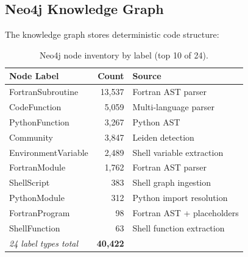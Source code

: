 \documentclass[11pt,letterpaper]{article}
\begin{document}
\subsection{Neo4j Knowledge Graph}

The knowledge graph stores deterministic code structure:

\begin{table}[H]
\centering
\caption{Neo4j node inventory by label (top 10 of 24).}
\label{tab:nodes}
\begin{tabular}{@{}lrl@{}}
\toprule
\textbf{Node Label} & \textbf{Count} & \textbf{Source} \\
\midrule
FortranSubroutine  & 13,537 & Fortran AST parser \\
CodeFunction       & 5,059  & Multi-language parser \\
PythonFunction     & 3,267  & Python AST \\
Community          & 3,847  & Leiden detection \\
EnvironmentVariable & 2,489 & Shell variable extraction \\
FortranModule      & 1,762  & Fortran AST parser \\
ShellScript        & 383    & Shell graph ingestion \\
PythonModule       & 312    & Python import resolution \\
FortranProgram     & 98     & Fortran AST + placeholders \\
ShellFunction      & 63     & Shell function extraction \\
\midrule
\textit{24 label types total} & \textbf{40,422} & \\
\bottomrule
\end{tabular}
\end{table}
\end{document}
